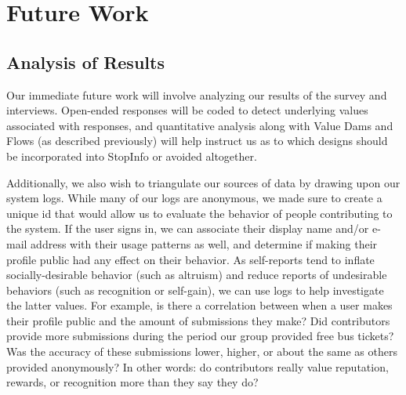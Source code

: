 \section{Future Work}
\label{sec:discussion-future-work}

\subsection{Analysis of Results}
Our immediate future work will involve analyzing our results of the survey and interviews. Open-ended responses will be coded to detect underlying values associated with responses, and quantitative analysis along with Value Dams and Flows (as described previously) will help instruct us as to which designs should be incorporated into StopInfo or avoided altogether.

Additionally, we also wish to triangulate our sources of data by drawing upon our system logs. While many of our logs are anonymous, we made sure to create a unique id that would allow us to evaluate the behavior of people contributing to the system. If the user signs in, we can associate their display name and/or e-mail address with their usage patterns as well, and determine if making their profile public had any effect on their behavior. As self-reports tend to inflate socially-desirable behavior (such as altruism) and reduce reports of undesirable behaviors (such as recognition or self-gain), we can use logs to help investigate the latter values. For example, is there a correlation between when a user makes their profile public and the amount of submissions they make? Did contributors provide more submissions during the period our group provided free bus tickets? Was the accuracy of these submissions lower, higher, or about the same as others provided anonymously? In other words: do contributors really value reputation, rewards, or recognition more than they say they do?

\pagebreak 

